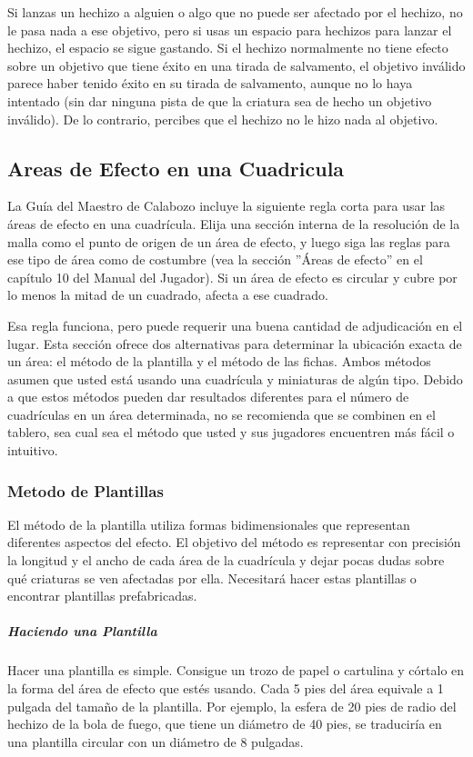 \documentclass[a4paper,twocolumn,openany,10pt]{dndbook}
\begin{document}
Si lanzas un hechizo a alguien o algo que no puede ser afectado por el hechizo, no le pasa nada a ese objetivo, pero si usas un
espacio para hechizos para lanzar el hechizo, el espacio se sigue gastando. Si el hechizo normalmente no tiene efecto sobre un
objetivo que tiene éxito en una tirada de salvamento, el objetivo inválido parece haber tenido éxito en su tirada de salvamento,
aunque no lo haya intentado (sin dar ninguna pista de que la criatura sea de hecho un objetivo inválido). De lo contrario,
percibes que el hechizo no le hizo nada al objetivo.

\subsection{Areas de Efecto en una Cuadricula}

La Guía del Maestro de Calabozo incluye la siguiente regla corta para usar las áreas de efecto en una cuadrícula. Elija una
sección interna de la resolución de la malla como el punto de origen de un área de efecto, y luego siga las reglas para ese tipo
de área como de costumbre (vea la sección ''Áreas de efecto'' en el capítulo 10 del Manual del Jugador). Si un área de efecto es
circular y cubre por lo menos la mitad de un cuadrado, afecta a ese cuadrado.

Esa regla funciona, pero puede requerir una buena cantidad de adjudicación en el lugar. Esta sección ofrece dos alternativas para
determinar la ubicación exacta de un área: el método de la plantilla y el método de las fichas. Ambos métodos asumen que usted
está usando una cuadrícula y miniaturas de algún tipo. Debido a que estos métodos pueden dar resultados diferentes para el número
de cuadrículas en un área determinada, no se recomienda que se combinen en el tablero, sea cual sea el método que usted y sus
jugadores encuentren más fácil o intuitivo.

\subsubsection{Metodo de Plantillas}
El método de la plantilla utiliza formas bidimensionales que representan diferentes aspectos del efecto. El objetivo del método
es representar con precisión la longitud y el ancho de cada área de la cuadrícula y dejar pocas dudas sobre qué criaturas se ven
afectadas por ella. Necesitará hacer estas plantillas o encontrar plantillas prefabricadas.

\subparagraph{Haciendo una Plantilla} Hacer una plantilla es simple. Consigue un trozo de papel o cartulina y córtalo en la forma
del área de efecto que estés usando. Cada 5 pies del área equivale a 1 pulgada del tamaño de la plantilla. Por ejemplo, la esfera
de 20 pies de radio del hechizo de la bola de fuego, que tiene un diámetro de 40 pies, se traduciría en una plantilla circular
con un diámetro de 8 pulgadas.
\end{document}
